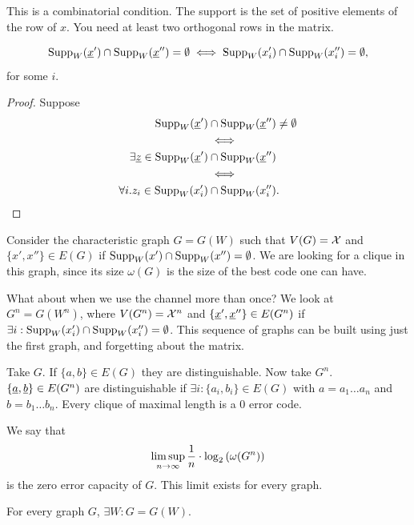 This is a combinatorial condition.
The support is the set of positive elements of the row of $x$.
You need at least two orthogonal rows in the matrix.

\begin{obs}
	\begin{equation*}
		\mathrm{Supp}_W(\underline{x}') \cap \mathrm{Supp}_W(\underline{x}'') = \emptyset
		\iff
		\mathrm{Supp}_W(x_i') \cap \mathrm{Supp}_W(x_i'') = \emptyset,
	\end{equation*}
	for some $i$. 
\end{obs}

\begin{proof}
	Suppose 
	\begin{align*}
		\mathrm{Supp}_W(\underline{x}') & \cap \mathrm{Supp}_W(\underline{x}'') \neq \emptyset
		\\
		& \iff
		\\
		\exists \underline{z} \in \mathrm{Supp}_W(\underline{x}') & \cap \mathrm{Supp}_W(\underline{x}'')
		\\
		& \iff
		\\
		\forall i . 
		z_i \in \mathrm{Supp}_W(x_i') & \cap \mathrm{Supp}_W(x_i''). \qedhere
	\end{align*}
\end{proof}

Consider the characteristic graph $G = G(W)$ such that $V(G) = \mathcal{X}$ and $\{x', x''\} \in E(G)$ if $\mathrm{Supp}_W(x') \cap \mathrm{Supp}_W(x'') = \emptyset$.
We are looking for a clique in this graph, since its size $\omega(G)$ is the size of the best code one can have.

What about when we use the channel more than once?
We look at $G^n = G(W^n)$, where $V(G^n) = \mathcal{X}^n$ and $\{\underline{x}', \underline{x}''\} \in E(G^n)$ if $\exists i : \mathrm{Supp}_W(x_i') \cap \mathrm{Supp}_W(x_i'') = \emptyset$.
This sequence of graphs can be built using just the first graph, and forgetting about the matrix.

Take $G$.
If $\{a, b\} \in E(G)$ they are distinguishable.
Now take $G^n$.
$\{\underline{a}, \underline{b}\} \in E(G^n)$ are distinguishable if $\exists i : \{a_i, b_i\} \in E(G)$ with $a = a_1 \dots a_n$ and $b = b_1 \dots b_n$.
Every clique of maximal length is a 0 error code.

We say that 
\begin{equation*}
	\limsup_{n \to \infty} \frac{1}{n} \cdot \log_2 \left( {\omega(G^n)} \right)
\end{equation*}
is the zero error capacity of $G$.
This limit exists for every graph.

\begin{prop}
	For every graph $G$, $\exists W : G = G(W)$.
\end{prop}

